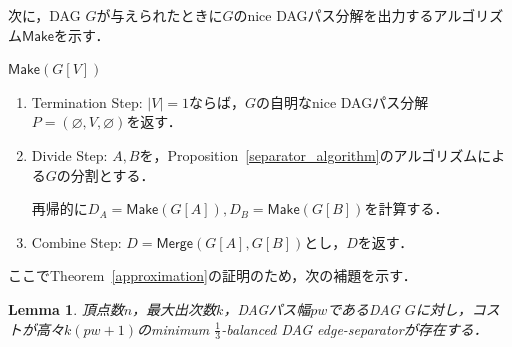 \documentclass[master]{kuisthesis}		%
\theoremstyle{plain}
\newtheorem{lemma}{Lemma}
\theoremstyle{definition}
\begin{document}

次に，DAG $G$が与えられたときに$G$のnice DAGパス分解を出力するアルゴリズム$\mathsf{Make}$を示す．


$\mathsf{Make}(G[V])$
\begin{enumerate}
    \item Termination Step: $|V|=1$ならば，$G$の自明なnice DAGパス分解$P = (\varnothing, V, \varnothing)$を返す．
    \item Divide Step: $A, B$を，Proposition~\ref{separator_algorithm}のアルゴリズムによる$G$の分割とする．\par
    再帰的に$D_A = \mathsf{Make}(G[A]), D_B = \mathsf{Make}(G[B])$を計算する．
    \item Combine Step: $D = \mathsf{Merge}(G[A], G[B])$とし，$D$を返す．
\end{enumerate}


ここでTheorem~\ref{approximation}の証明のため，次の補題を示す．

\begin{lemma}\label{sepa_pw_relation}
    頂点数$n$，最大出次数$k$，DAGパス幅$pw$であるDAG $G$に対し，コストが高々$k(pw+1)$のminimum $\frac{1}{3}$-balanced DAG edge-separatorが存在する．
\end{lemma}
\end{document}
